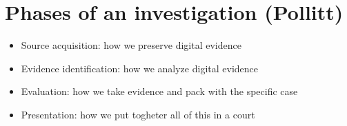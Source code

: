 \section{Phases of an investigation (Pollitt)}
    \begin{itemize}
        \item Source acquisition: how we preserve digital evidence
        \item Evidence identification: how we analyze digital evidence 
        \item Evaluation: how we take evidence and pack with the specific case
        \item Presentation: how we put togheter all of this in a court
    \end{itemize}